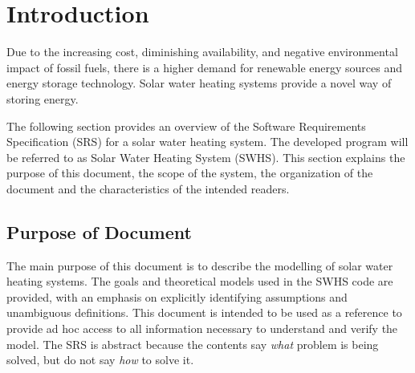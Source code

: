 \documentclass[12pt]{article}
\newcommand{\progname}{SWHS}
\begin{document}
\section{Introduction}

Due to the increasing cost, diminishing availability, and negative environmental
impact of fossil fuels, there is a higher demand for renewable energy sources
and energy storage technology.  Solar water heating systems
provide a novel way of
storing energy.%





The following section provides an overview of the Software Requirements
Specification (SRS) for a solar water heating system.
The
developed program will be referred to as Solar Water Heating System 
(\progname{}).  This section explains the purpose of this document, the scope 
of the system, the organization of the document and the characteristics of the 
intended readers.

\subsection{Purpose of Document}

The main purpose of this document is to describe the modelling of solar water
heating systems.
The goals and theoretical models used in the 
\progname{} code are provided, with an emphasis on explicitly identifying 
assumptions and unambiguous definitions.  This document is intended to be used 
as a reference to provide ad hoc access to all information necessary to 
understand and verify the model.  The SRS is abstract because the contents say
\emph{what} problem is being solved, but do not say \emph{how} to solve it.
\end{document}

